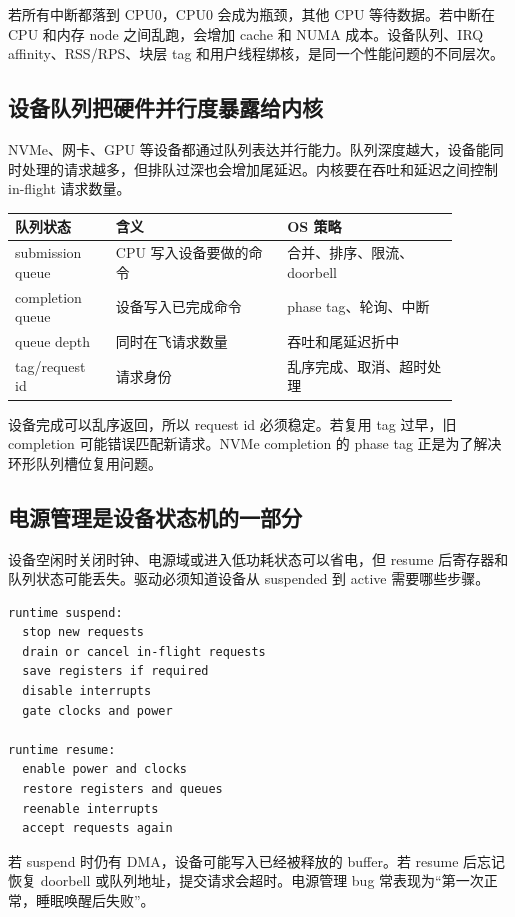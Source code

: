 若所有中断都落到 CPU0，CPU0 会成为瓶颈，其他 CPU 等待数据。若中断在 CPU 和内存 node 之间乱跑，会增加 cache 和 NUMA 成本。设备队列、IRQ affinity、RSS/RPS、块层 tag 和用户线程绑核，是同一个性能问题的不同层次。

\subsection{设备队列把硬件并行度暴露给内核}

NVMe、网卡、GPU 等设备都通过队列表达并行能力。队列深度越大，设备能同时处理的请求越多，但排队过深也会增加尾延迟。内核要在吞吐和延迟之间控制 in-flight 请求数量。

\begin{longtable}{p{0.2\linewidth}p{0.34\linewidth}p{0.34\linewidth}}
\toprule
队列状态 & 含义 & OS 策略 \\
\midrule
submission queue & CPU 写入设备要做的命令 & 合并、排序、限流、doorbell \\
completion queue & 设备写入已完成命令 & phase tag、轮询、中断 \\
queue depth & 同时在飞请求数量 & 吞吐和尾延迟折中 \\
tag/request id & 请求身份 & 乱序完成、取消、超时处理 \\
\bottomrule
\end{longtable}

设备完成可以乱序返回，所以 request id 必须稳定。若复用 tag 过早，旧 completion 可能错误匹配新请求。NVMe completion 的 phase tag 正是为了解决环形队列槽位复用问题。

\subsection{电源管理是设备状态机的一部分}

设备空闲时关闭时钟、电源域或进入低功耗状态可以省电，但 resume 后寄存器和队列状态可能丢失。驱动必须知道设备从 suspended 到 active 需要哪些步骤。

\begin{lstlisting}
runtime suspend:
  stop new requests
  drain or cancel in-flight requests
  save registers if required
  disable interrupts
  gate clocks and power

runtime resume:
  enable power and clocks
  restore registers and queues
  reenable interrupts
  accept requests again
\end{lstlisting}

若 suspend 时仍有 DMA，设备可能写入已经被释放的 buffer。若 resume 后忘记恢复 doorbell 或队列地址，提交请求会超时。电源管理 bug 常表现为“第一次正常，睡眠唤醒后失败”。

